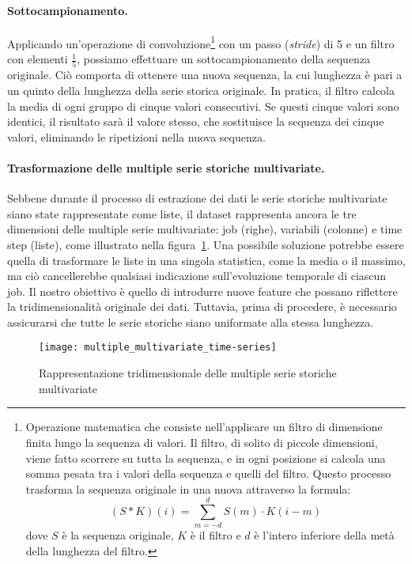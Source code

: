 \paragraph{Sottocampionamento.} Applicando un'operazione di
convoluzione\footnote{Operazione matematica che consiste nell'applicare un
    filtro di dimensione finita lungo la sequenza di valori. Il filtro, di
    solito di piccole dimensioni, viene fatto scorrere su tutta la sequenza, e
    in ogni posizione si calcola una somma pesata tra i valori della sequenza
    e quelli del filtro. Questo processo trasforma la sequenza originale in
    una nuova attraverso la formula: $$(S\ast
    K)(i)=\displaystyle\sum_{m=-d}^{d}S(m)\cdot K(i-m)$$ dove $S$ è la
sequenza originale, $K$ è il filtro e $d$ è l'intero inferiore della metà
della lunghezza del filtro.} con un passo (\textit{stride}) di 5 e un filtro
con elementi $\frac{1}{5}$, possiamo effettuare un sottocampionamento della
sequenza originale. Ciò comporta di ottenere una nuova sequenza, la cui
lunghezza è pari a un quinto della lunghezza della serie storica originale. In
pratica, il filtro calcola la media di ogni gruppo di cinque valori
consecutivi. Se questi cinque valori sono identici, il risultato sarà il
valore stesso, che sostituisce la sequenza dei cinque valori, eliminando le
ripetizioni nella nuova sequenza.

\paragraph{Trasformazione delle multiple serie storiche multivariate.} Sebbene
durante il processo di estrazione dei dati le serie storiche multivariate
siano state rappresentate come liste, il dataset rappresenta ancora le tre
dimensioni delle multiple serie multivariate: job (righe), variabili (colonne)
e time step (liste), come illustrato nella
figura~\ref{fig:multiple_multivariate_time-series}. Una possibile soluzione
potrebbe essere quella di trasformare le liste in una singola statistica, come
la media o il massimo, ma ciò cancellerebbe qualsiasi indicazione
sull'evoluzione temporale di ciascun job. Il nostro obiettivo è quello di
introdurre nuove feature che possano riflettere la tridimensionalità originale
dei dati. Tuttavia, prima di procedere, è necessario assicurarsi che tutte le
serie storiche siano uniformate alla stessa lunghezza.

\begin{figure}[!ht]
   \centering
   \texttt{[image: multiple\_multivariate\_time-series]}
   \caption{Rappresentazione tridimensionale delle multiple serie storiche
   multivariate}
   \label{fig:multiple_multivariate_time-series}
\end{figure}

